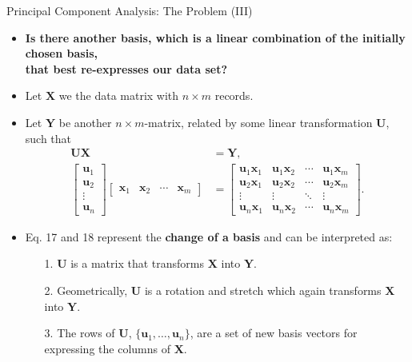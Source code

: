 \begin{frame}{Principal Component Analysis: The Problem (III)}
	\begin{itemize}
		\item \textbf{Is there another basis, which is a linear combination of 
		the initially chosen basis, \\
			that best re-expresses our data set?}
		\item Let $\mathbf{X}$ we the data matrix with $n \times m$ records.
		\item Let $\mathbf{Y}$ be another $n \times m$-matrix, related by some 
		linear transformation $\mathbf{U}$, such that
		\begin{align}
			\mathbf{U}\mathbf{X} &= \mathbf{Y},\\
			\begin{bmatrix}
				\mathbf{u}_1 \\
				\mathbf{u}_2 \\
				\vdots \\
				\mathbf{u}_n
			\end{bmatrix}
			\begin{bmatrix}
				\mathbf{x}_1             & \mathbf{x}_2             & \cdots & 
				\mathbf{x}_m             
			\end{bmatrix} &=
			\begin{bmatrix}
				\mathbf{u}_1\mathbf{x}_1 & \mathbf{u}_1\mathbf{x}_2 & \cdots & 
				\mathbf{u}_1\mathbf{x}_m \\
				\mathbf{u}_2\mathbf{x}_1 & \mathbf{u}_2\mathbf{x}_2 & \cdots & 
				\mathbf{u}_2\mathbf{x}_m \\
				\vdots                   & \vdots                   & \ddots & 
				\vdots                   \\
				\mathbf{u}_n\mathbf{x}_1 & \mathbf{u}_n\mathbf{x}_2 & \cdots & 
				\mathbf{u}_n\mathbf{x}_m 
			\end{bmatrix}.
		\end{align}
		\item Eq. 17 and 18 represent the \textbf{change of a basis} and can be 
		interpreted as:
		\begin{itemize}
			\item[1.] $\mathbf{U}$ is a matrix that transforms $\mathbf{X}$ 
			into $\mathbf{Y}$.
			\item[2.] Geometrically, $\mathbf{U}$ is a rotation and stretch 
			which again transforms $\mathbf{X}$ into $\mathbf{Y}$.
			\item[3.] The rows of $\mathbf{U}$, 
			$\{\mathbf{u}_1,\ldots,\mathbf{u}_n\}$, are a set of new basis 
			vectors for expressing the columns of $\mathbf{X}$.
		\end{itemize}
	\end{itemize}
\end{frame}

